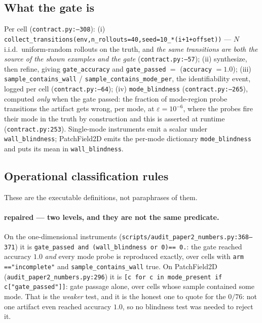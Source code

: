 \subsection{What the gate is}
\label{app:proto-gate}

Per cell (\texttt{contract.\allowbreak py:--308}): (i)
\texttt{collect\_\allowbreak transitions(env,\allowbreak  n\_\allowbreak rollouts=40,\allowbreak  seed=10\_*(i+1+offset)\allowbreak )\allowbreak } ---
$N$ i.i.d.\ uniform-random rollouts on the truth, and \emph{the same transitions
are both the source of the shown examples and the gate}
(\texttt{contract.\allowbreak py:--57}); (ii) synthesize, then refine, giving
\texttt{gate\_accuracy} and \texttt{gate\_passed} $=$
(\texttt{accuracy} $= 1.0$); (iii) \texttt{sample\_\allowbreak contains\_\allowbreak wall} /
\texttt{sample\_\allowbreak contains\_\allowbreak mode\_\allowbreak per}, the identifiability event, logged per cell
(\texttt{contract.\allowbreak py:--64}); (iv) \texttt{mode\_blindness}
(\texttt{contract.\allowbreak py:--265}), computed \emph{only} when the gate passed: the
fraction of mode-region probe transitions the artifact gets wrong, per mode, at
$\varepsilon = 10^{-6}$, where the probes fire their mode in the truth by
construction and this is asserted at runtime (\texttt{contract.py:253}).
Single-mode instruments emit a scalar under \texttt{wall\_blindness};
PatchField2D emits the per-mode dictionary \texttt{mode\_blindness} and puts its
mean in \texttt{wall\_blindness}.

\subsection{Operational classification rules}
\label{app:proto-classes}

These are the executable definitions, not paraphrases of them.

\paragraph{repaired --- two levels, and they are not the same predicate.} On the
one-dimensional instruments (\texttt{scripts/\allowbreak audit\_\allowbreak paper2\_\allowbreak numbers.\allowbreak py:368--371})
it is \texttt{gate\_\allowbreak passed and (wall\_\allowbreak blindness or 0)\allowbreak  == 0.}: the gate reached
accuracy $1.0$ \emph{and} every mode probe is reproduced exactly, over cells with
\texttt{arm =\allowbreak =\allowbreak  "incomplete"} and \texttt{sample\_\allowbreak contains\_\allowbreak wall} true. On
PatchField2D (\texttt{audit\_\allowbreak paper2\_\allowbreak numbers.\allowbreak py:296}) it is
\texttt{[c for c in mode\_\allowbreak present if c["gate\_\allowbreak passed"]\allowbreak ]\allowbreak }: gate passage alone,
over cells whose sample contained some mode. That is the \emph{weaker} test, and
it is the honest one to quote for the $0/76$: not one artifact even reached
accuracy $1.0$, so no blindness test was needed to reject it.

